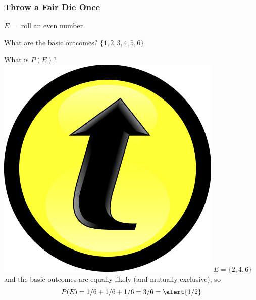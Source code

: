 \documentclass[handout]{beamer}
\begin{document}
\begin{frame}
\frametitle{Throw a Fair Die Once}
\begin{block}{$E = $ roll an even number}
\end{block}
\begin{block}{What are the basic outcomes?}\pause
$\{1,2,3,4,5,6\}$
\end{block}\pause
\begin{block}{What is $P(E)$?\hfill \includegraphics[scale = 0.05]{./images/clicker} }\pause
$E = \{2,4,6\}$ and the basic outcomes are equally likely (and mutually exclusive), so 
	$$P(E) = 1/6 + 1/6 + 1/6 = 3/6 = \alert{1/2}$$
\end{block}

\end{frame}
\end{document}
